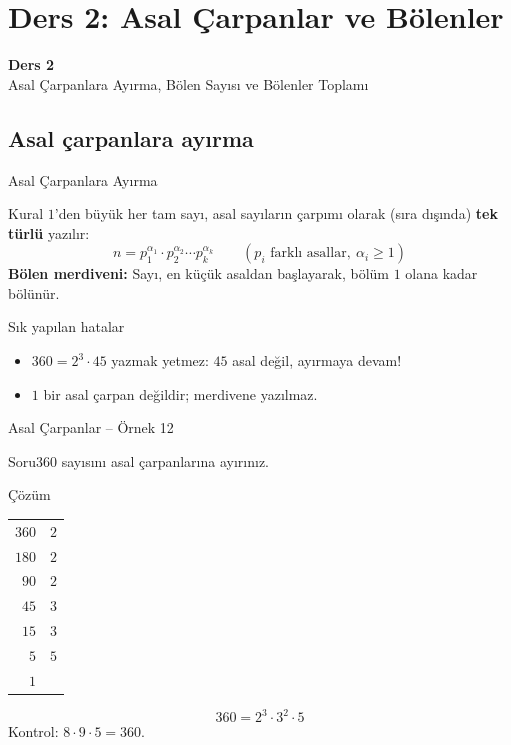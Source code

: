 \documentclass[aspectratio=169,11pt]{beamer}
\newcommand{\soru}[3]{%
\begin{frame}{#1}
  \begin{block}{Soru}\large #2\end{block}
  \pause
  \begin{exampleblock}{Çözüm}\large #3\end{exampleblock}
\end{frame}}
\begin{document}
\section{Ders 2: Asal Çarpanlar ve Bölenler}
\begin{frame}
\centering\Large\color{anamavi}\textbf{Ders 2}\\[6pt]\normalsize Asal Çarpanlara Ayırma, Bölen Sayısı ve Bölenler Toplamı
\end{frame}

\subsection{Asal çarpanlara ayırma}
\begin{frame}{Asal Çarpanlara Ayırma}
\begin{block}{Kural}
\(1\)'den büyük her tam sayı, asal sayıların çarpımı olarak (sıra dışında) \textbf{tek türlü} yazılır:
\[n=p_1^{\alpha_1}\cdot p_2^{\alpha_2}\cdots p_k^{\alpha_k}\qquad(p_i \text{ farklı asallar},\ \alpha_i\ge 1)\]
\textbf{Bölen merdiveni:} Sayı, en küçük asaldan başlayarak, bölüm \(1\) olana kadar bölünür.
\end{block}
\begin{alertblock}{Sık yapılan hatalar}
\begin{itemize}
\item \(360=2^3\cdot 45\) yazmak yetmez: \(45\) asal değil, ayırmaya devam!
\item \(1\) bir asal çarpan değildir; merdivene yazılmaz.
\end{itemize}
\end{alertblock}
\end{frame}

\soru{Asal Çarpanlar -- Örnek 12}
{\(360\) sayısını asal çarpanlarına ayırınız.}
{\begin{minipage}[t]{0.3\linewidth}
\normalsize
\begin{tabular}{r|l}
\(360\) & \(2\)\\ \(180\) & \(2\)\\ \(90\) & \(2\)\\ \(45\) & \(3\)\\ \(15\) & \(3\)\\ \(5\) & \(5\)\\ \(1\) &
\end{tabular}
\end{minipage}\hfill
\begin{minipage}[t]{0.65\linewidth}
\vspace{20pt}
\[360=2^3\cdot 3^2\cdot 5\]
Kontrol: \(8\cdot 9\cdot 5=360\).
\end{minipage}}
\end{document}

